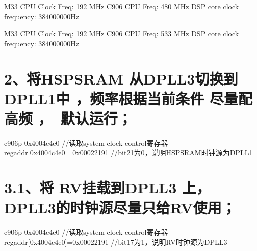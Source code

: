 \documentclass[letterpaper,10pt,english]{sphinxmanual}
\begin{document}
\begin{sphinxVerbatim}[commandchars=\\\{\}]
M33 CPU Clock Freq: 192 MHz
C906 CPU Freq: 480 MHz
DSP core clock frequency: 384000000Hz
\end{sphinxVerbatim}

\sphinxAtStartPar
{}

\begin{sphinxVerbatim}[commandchars=\\\{\}]
M33 CPU Clock Freq: 192 MHz
C906 CPU Freq: 533 MHz
DSP core clock frequency: 384000000Hz
\end{sphinxVerbatim}


\section{2、将HS\sphinxhyphen{}PSRAM 从DPLL3切换到DPLL1中 ，频率根据当前条件 尽量配高频 ， 默认运行；}
\label{\detokenize{r128_u9a8c_u8bc1_u56fa_u4ef6/r128_u9a8c_u8bc1_u56fa_u4ef6_u5f00_u53d1_u6307_u5357:hs-psram-dpll3dpll1}}
\sphinxAtStartPar
{}

\begin{sphinxVerbatim}[commandchars=\\\{\}]
c906\PYGZgt{}p 0x4004c4e0 //读取system clock control寄存器
reg\PYGZus{}addr[0x4004c4e0]=0x00022191  //bit21为0，说明HS\PYGZhy{}PSRAM时钟源为DPLL1
\end{sphinxVerbatim}

\sphinxAtStartPar
{}


\section{3.1、将 RV挂载到DPLL3 上，DPLL3的时钟源尽量只给RV使用；}
\label{\detokenize{r128_u9a8c_u8bc1_u56fa_u4ef6/r128_u9a8c_u8bc1_u56fa_u4ef6_u5f00_u53d1_u6307_u5357:id3}}
\sphinxAtStartPar
{}

\begin{sphinxVerbatim}[commandchars=\\\{\}]
c906\PYGZgt{}p 0x4004c4e0 //读取system clock control寄存器
reg\PYGZus{}addr[0x4004c4e0]=0x00022191  //bit17为1，说明RV时钟源为DPLL3
\end{sphinxVerbatim}

\sphinxAtStartPar
{}
\end{document}
